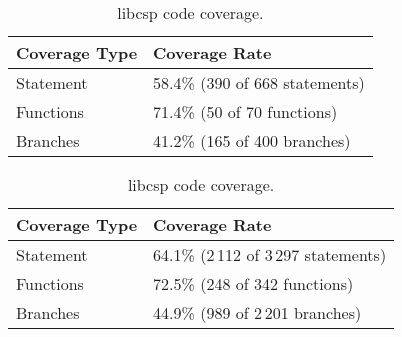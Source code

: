 
\begin{table}[h]

\footnotesize
\parbox{.45\linewidth}{
\centering
\begin{tabular}{|l|l|}
\hline
\textbf{Coverage Type} & \textbf{Coverage Rate} \\
\hline
Statement     & 58.4\% (390 of 668 statements)\\
Functions     & 71.4\% (50 of 70 functions)\\
Branches      & 41.2\% (165 of 400 branches)\\
\hline
\end{tabular}
\caption{libgscsp extension code coverage.}
\label{table:libgscsp_coverage}
}
\hfill
\parbox{.45\linewidth}{
\centering
\begin{tabular}{|l|l|}
\hline
\textbf{Coverage Type} & \textbf{Coverage Rate} \\
\hline
Statement     & 64.1\% (2\,112 of 3\,297 statements)\\
Functions     & 72.5\% (248 of 342 functions)\\
Branches      & 44.9\% (989 of 2\,201 branches)\\
\hline
\end{tabular}
\caption{libcsp code coverage.}
\label{table:libcsp_coverage}
}
\end{table}